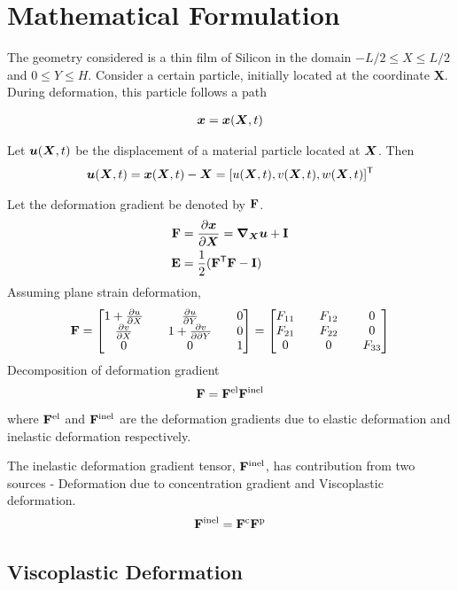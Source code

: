 \documentclass[../main.tex]{subfiles}
\begin{document}
\section{Mathematical Formulation}
The geometry considered is a thin film of Silicon in the domain $ -L/2 \le X \le L/2$ and $0 \le Y \le H$. Consider a certain particle, initially located at the coordinate \textbf{X}. During deformation, this particle follows a path 



\begin{gather}
{\bm{x}} = {\bm{x}}({\bm{X}},t)
\end{gather}

\vspace{0.25cm}
Let ${\bm{u}}({\bm{X}}, t)$ be the displacement of a material particle located at ${\bm{X}}$. Then
\begin{gather}
    {\bm{u}}({\bm{X}}, t) = {\bm{x}}({\bm{X}}, t) - {\bm{X}} = [u({\bm{X}}, t), v({\bm{X}}, t), w({\bm{X}}, t)]^{{\sf {T}}}
\end{gather}

Let the deformation gradient be denoted by $\mathbf{F}$.
\begin{align}
    \mathbf{F} &= \frac{\partial {\bm{x}}}{\partial {\bm{X}}} = \bm{\nabla}_{\bm{X}} {\bm{u}} + \mathbf{I} \\
    \mathbf{E} &= \frac{1}{2}(\mathbf{F}^{\sf {T}} \mathbf{F} - \mathbf{I})
\end{align}
Assuming plane strain deformation, 
\begin{align}
\mathbf{F} = 
\begin{bmatrix}
       1 + \frac{\partial u}{\partial X} && \frac{\partial u}{\partial Y} && 0 \\
       \frac{\partial v}{\partial X} && 1 + \frac{\partial v}{\partial \partial Y} && 0 \\
       0 && 0 && 1
\end{bmatrix} = \begin{bmatrix} F_{11} && F_{12} && 0 \\ F_{21} && F_{22} && 0 \\ 0 && 0 && F_{33} \end{bmatrix}
\end{align}
Decomposition of deformation gradient
\begin{gather}
\mathbf{F} = \mathbf{F}^{{\rm{el}}} \mathbf{F}^{{\rm{inel}}}
\end{gather}
where $\mathbf{F}^{{\rm{el}}}$ and $\mathbf{F}^{{\rm{inel}}}$ are the deformation gradients due to elastic deformation and inelastic deformation respectively.

The inelastic deformation gradient tensor, $\mathbf{F}^{{\rm{inel}}}$, has contribution from two sources - Deformation due to concentration gradient and Viscoplastic deformation.
\begin{align}
    \mathbf{F}^{\rm{inel}} = \mathbf{F}^{\rm{c}} \mathbf{F}^{\rm{p}}
\end{align}


\subsection{Viscoplastic Deformation}
\end{document}
